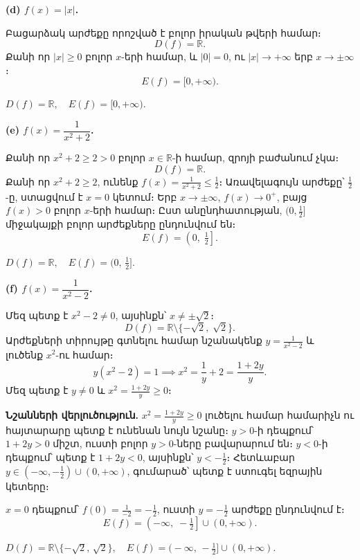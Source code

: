 \documentclass[12pt, a4paper]{article}
\newcommand{\R}{\mathbb{R}}
\begin{document}
\bigskip
\textbf{(d)\; $f(x) = |x|$.}

Բացարձակ արժեքը որոշված է բոլոր իրական թվերի համար։
\[
  D(f) = \R.
\]
Քանի որ $|x| \ge 0$ բոլոր $x$-երի համար, և $|0| = 0$, ու $|x| \to +\infty$ երբ $x \to \pm\infty$։
\[
  E(f) = [0, +\infty).
\]

\begin{answerbox}
$D(f) = \R, \quad E(f) = [0, +\infty).$
\end{answerbox}

\bigskip
\textbf{(e)\; $f(x) = \dfrac{1}{x^2+2}$.}

Քանի որ $x^2 + 2 \ge 2 > 0$ բոլոր $x \in \R$-ի համար, զրոյի բաժանում չկա։
\[
  D(f) = \R.
\]
Քանի որ $x^2 + 2 \ge 2$, ունենք $f(x) = \frac{1}{x^2+2} \le \frac{1}{2}$։
Առավելագույն արժեքը՝ $\frac{1}{2}$-ը, ստացվում է $x = 0$ կետում։
Երբ $x \to \pm\infty$, $f(x) \to 0^+$, բայց $f(x) > 0$ բոլոր $x$-երի համար։
Ըստ անընդհատության, $(0, \frac{1}{2}]$ միջակայքի բոլոր արժեքները ընդունվում են։
\[
  E(f) = \left(0,\; \tfrac{1}{2}\right].
\]

\begin{answerbox}
$D(f) = \R, \quad E(f) = \bigl(0,\, \frac{1}{2}\bigr].$
\end{answerbox}

\bigskip
\textbf{(f)\; $f(x) = \dfrac{1}{x^2-2}$.}

Մեզ պետք է $x^2 - 2 \neq 0$, այսինքն՝ $x \neq \pm\sqrt{2}$։
\[
  D(f) = \R \setminus \{-\sqrt{2},\; \sqrt{2}\}.
\]
Արժեքների տիրույթը գտնելու համար նշանակենք $y = \frac{1}{x^2 - 2}$ և լուծենք $x^2$-ու համար։
\[
  y(x^2 - 2) = 1 \implies x^2 = \frac{1}{y} + 2 = \frac{1 + 2y}{y}.
\]
Մեզ պետք է $y \neq 0$ և $x^2 = \frac{1+2y}{y} \ge 0$։

\textbf{Նշանների վերլուծություն.}\; $x^2 = \frac{1+2y}{y} \ge 0$ լուծելու համար համարիչն ու հայտարարը պետք է ունենան նույն նշանը։ $y > 0$-ի դեպքում՝ $1+2y > 0$ միշտ, ուստի բոլոր $y > 0$-ները բավարարում են։ $y < 0$-ի դեպքում՝ պետք է $1+2y < 0$, այսինքն՝ $y < -\tfrac{1}{2}$։ Հետևաբար $y \in (-\infty, -\tfrac{1}{2}) \cup (0, +\infty)$, գումարած՝ պետք է ստուգել եզրային կետերը։

$x = 0$ դեպքում՝ $f(0) = \frac{1}{-2} = -\frac{1}{2}$, ուստի $y = -\frac{1}{2}$ արժեքը ընդունվում է։
\[
  E(f) = \left(-\infty,\; -\tfrac{1}{2}\right] \cup (0, +\infty).
\]

\begin{answerbox}
$D(f) = \R \setminus \{-\sqrt{2},\, \sqrt{2}\}, \quad
 E(f) = \bigl(-\infty,\, -\tfrac{1}{2}\bigr] \cup (0, +\infty).$
\end{answerbox}
\end{document}
